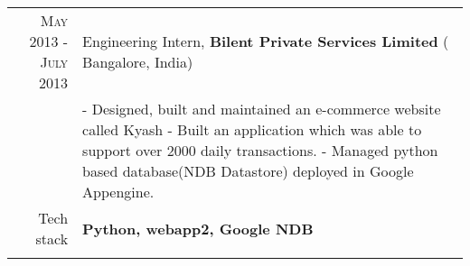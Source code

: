 \begin{tabular}{r|p{14cm}}
\textsc{May 2013 - July 2013 } & Engineering Intern, \textbf{Bilent Private Services Limited} ( Bangalore, India) \\
& \small{
- Designed, built and maintained an e-commerce website called Kyash \newline 
- Built an application which was able to support over 2000 daily transactions.\newline
- Managed python based database(NDB Datastore) deployed in Google Appengine.}\\
\small{Tech stack} &\footnotesize{\textbf{Python, webapp2, Google NDB}} \\
\multicolumn{2}{c}{}
\end{tabular}

